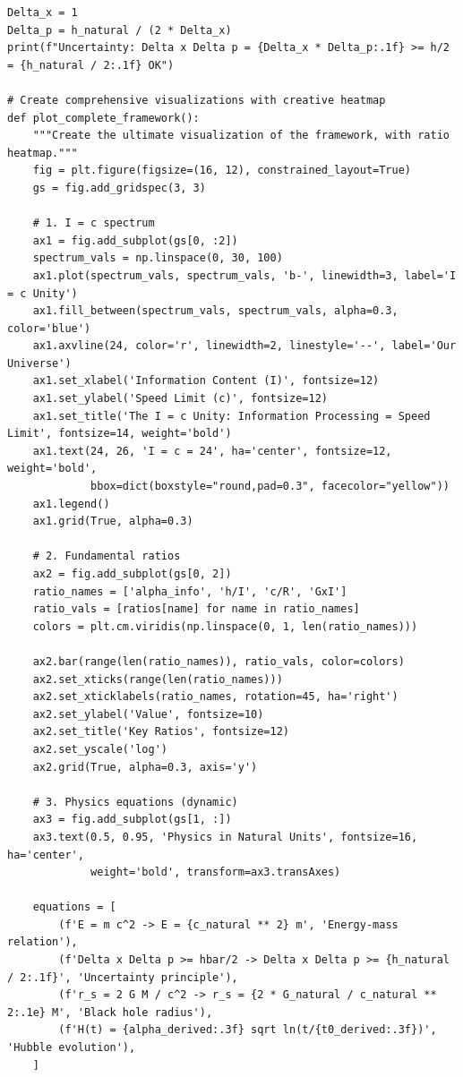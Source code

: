 \documentclass{article}
\begin{document}
\begin{verbatim}
Delta_x = 1
Delta_p = h_natural / (2 * Delta_x)
print(f"Uncertainty: Delta x Delta p = {Delta_x * Delta_p:.1f} >= h/2 = {h_natural / 2:.1f} OK")

# Create comprehensive visualizations with creative heatmap
def plot_complete_framework():
    """Create the ultimate visualization of the framework, with ratio heatmap."""
    fig = plt.figure(figsize=(16, 12), constrained_layout=True)
    gs = fig.add_gridspec(3, 3)
    
    # 1. I = c spectrum
    ax1 = fig.add_subplot(gs[0, :2])
    spectrum_vals = np.linspace(0, 30, 100)
    ax1.plot(spectrum_vals, spectrum_vals, 'b-', linewidth=3, label='I = c Unity')
    ax1.fill_between(spectrum_vals, spectrum_vals, alpha=0.3, color='blue')
    ax1.axvline(24, color='r', linewidth=2, linestyle='--', label='Our Universe')
    ax1.set_xlabel('Information Content (I)', fontsize=12)
    ax1.set_ylabel('Speed Limit (c)', fontsize=12)
    ax1.set_title('The I = c Unity: Information Processing = Speed Limit', fontsize=14, weight='bold')
    ax1.text(24, 26, 'I = c = 24', ha='center', fontsize=12, weight='bold',
             bbox=dict(boxstyle="round,pad=0.3", facecolor="yellow"))
    ax1.legend()
    ax1.grid(True, alpha=0.3)
    
    # 2. Fundamental ratios
    ax2 = fig.add_subplot(gs[0, 2])
    ratio_names = ['alpha_info', 'h/I', 'c/R', 'GxI']
    ratio_vals = [ratios[name] for name in ratio_names]
    colors = plt.cm.viridis(np.linspace(0, 1, len(ratio_names)))
    
    ax2.bar(range(len(ratio_names)), ratio_vals, color=colors)
    ax2.set_xticks(range(len(ratio_names)))
    ax2.set_xticklabels(ratio_names, rotation=45, ha='right')
    ax2.set_ylabel('Value', fontsize=10)
    ax2.set_title('Key Ratios', fontsize=12)
    ax2.set_yscale('log')
    ax2.grid(True, alpha=0.3, axis='y')
    
    # 3. Physics equations (dynamic)
    ax3 = fig.add_subplot(gs[1, :])
    ax3.text(0.5, 0.95, 'Physics in Natural Units', fontsize=16, ha='center',
             weight='bold', transform=ax3.transAxes)
    
    equations = [
        (f'E = m c^2 -> E = {c_natural ** 2} m', 'Energy-mass relation'),
        (f'Delta x Delta p >= hbar/2 -> Delta x Delta p >= {h_natural / 2:.1f}', 'Uncertainty principle'),
        (f'r_s = 2 G M / c^2 -> r_s = {2 * G_natural / c_natural ** 2:.1e} M', 'Black hole radius'),
        (f'H(t) = {alpha_derived:.3f} sqrt ln(t/{t0_derived:.3f})', 'Hubble evolution'),
    ]
    

\end{verbatim}
\end{document}
